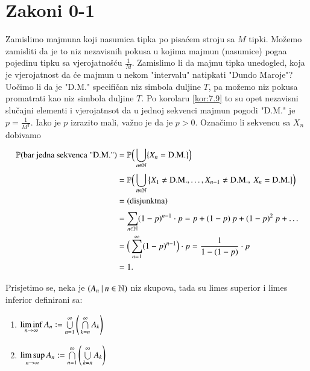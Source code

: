 
\chapter{Zakoni 0-1}  \label{zakoni_01}

\begin{pr}  \label{pr:9.1}
    Zamislimo majmuna koji nasumica tipka po pisa\' cem stroju sa $M$ tipki.
    Mo\v zemo zamisliti da je to niz nezavisnih pokusa u kojima majmun (nasumice) poga\dj a pojedinu tipku sa vjerojatno\v s\' cu $\frac{1}{M}$.
    Zamislimo li da majmu tipka unedogled, koja je vjerojatnost da \' ce majmun u nekom "intervalu" natipkati "Dundo Maroje"?
    Uo\v cimo li da je "D.M." specifi\v can niz simbola duljine $T$, pa mo\v zemo niz pokusa promatrati kao niz simbola duljine $T$.
    Po korolaru \ref{kor:7.9} to su opet nezavisni slu\v cajni elementi i vjerojatnsot da u jednoj sekvenci majmun pogodi "D.M." je $p = \frac{1}{M^T}$.
    Iako je $p$ izrazito mali, va\v zno je da je $p > 0$.
    Ozna\v cimo li sekvencu sa $X_n$ dobivamo
    \begin{equation*}
        \begin{aligned}
            \mathbb{P}({\textnormal{bar jedna sekvenca "D.M."}})
            &= \mathbb{P} \Big( \bigcup\limits_{n \in \mathbb{N}}^{} \{X_n = \textnormal{D.M.}\} \Big)\\
            &= \mathbb{P} \Big( \bigcup\limits_{n \in \mathbb{N}}^{} \big\{X_1 \neq \textnormal{D.M.}, \ldots, X_{n-1} \neq \textnormal{D.M.}, \: X_n = \textnormal{D.M.} \big\} \Big)\\
            &= \textnormal{(disjunktna)}\\
            &= \sum\limits_{n \in \mathbb{N}}^{} (1 - p)^{n - 1} \cdot p = p + (1 - p) \: p + (1 - p)^2 \: p + \ldots\\
            &= \Big( \sum\limits_{n = 1}^{\infty} (1 - p)^{n - 1} \Big) \cdot p = \frac{1}{1 - (1 - p)} \cdot p\\
            &= 1.
        \end{aligned}
    \end{equation*}
\end{pr}

\begin{nap} \label{nap:9.1-1}
    Prisjetimo se, neka je $({A_n} \: | \: {n \in \mathbb{N}})$ niz skupova, tada su limes superior i limes inferior definirani sa:
    \begin{enumerate}[label=(\roman*)]
        \item $\liminf\limits_{n \to \infty} A_n := \bigcup\limits_{n = 1}^{\infty} \Bigg( \bigcap\limits_{k = n}^{\infty} A_k \Bigg)$
        \item $\limsup\limits_{n \to \infty} A_n := \bigcap\limits_{n = 1}^{\infty} \Bigg( \bigcup\limits_{k = n}^{\infty} A_k \Bigg)$
    \end{enumerate}
\end{nap}

